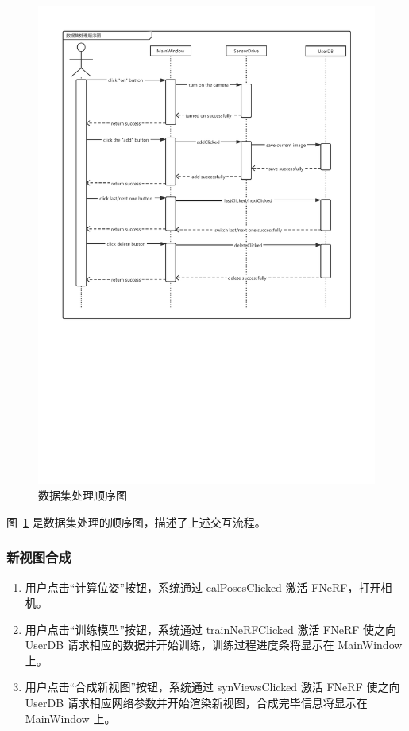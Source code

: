 \begin{figure}[htbp]
	\centering
	\includegraphics[width=0.85\linewidth]{figures/datasetProcessSD.pdf}
	\caption{数据集处理顺序图}
	\label{fig:datasetProcessSD}
\end{figure}

图~\ref{fig:datasetProcessSD} 是数据集处理的顺序图，描述了上述交互流程。

\subsubsection{新视图合成}
\begin{enumerate}
	\item 用户点击“计算位姿”按钮，系统通过 calPosesClicked 激活 FNeRF，打开相机。
	
	\item 用户点击“训练模型”按钮，系统通过 trainNeRFClicked 激活 FNeRF 使之向 UserDB 请求相应的数据并开始训练，训练过程进度条将显示在 MainWindow 上。
	
	\item 用户点击“合成新视图”按钮，系统通过 synViewsClicked 激活 FNeRF 使之向 UserDB 请求相应网络参数并开始渲染新视图，合成完毕信息将显示在 MainWindow 上。
\end{enumerate}

